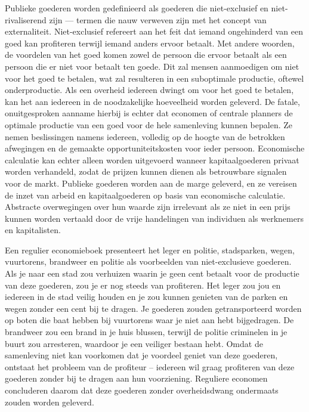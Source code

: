 Publieke goederen worden gedefinieerd als goederen die niet-exclusief en niet-ri\-va\-li\-se\-rend zijn --- termen die nauw verweven zijn met het concept van externaliteit. Niet-exclusief refereert aan het feit dat iemand ongehinderd van een goed kan profiteren terwijl iemand anders ervoor betaalt. Met andere woorden, de voordelen van het goed komen zowel de persoon die ervoor betaalt als een persoon die er niet voor betaalt ten goede. Dit zal mensen aanmoedigen om niet voor het goed te betalen, wat zal resulteren in een suboptimale productie, oftewel onderproductie. Als een overheid iedereen dwingt om voor het goed te betalen, kan het aan iedereen in de noodzakelijke hoeveelheid worden geleverd. De fatale, onuitgesproken aanname hierbij is echter dat economen of centrale planners de optimale productie van een goed voor de hele samenleving kunnen bepalen. Ze nemen beslissingen namens iedereen, volledig op de hoogte van de betrokken afwegingen en de gemaakte opportuniteitskosten voor ieder persoon. Economische calculatie kan echter alleen worden uitgevoerd wanneer kapitaalgoederen privaat worden verhandeld, zodat de prijzen kunnen dienen als betrouwbare signalen voor de markt. Publieke goederen worden aan de marge geleverd, en ze vereisen de inzet van arbeid en kapitaalgoederen op basis van economische calculatie. Abstracte overwegingen over hun waarde zijn irrelevant als ze niet in een prijs kunnen worden vertaald door de vrije handelingen van individuen als werknemers en kapitalisten.

Een regulier economieboek presenteert het leger en politie, stadsparken, wegen, vuurtorens, brandweer en politie als voorbeelden van niet-exclusieve goederen. Als je naar een stad zou verhuizen waarin je geen cent betaalt voor de productie van deze goederen, zou je er nog steeds van profiteren. Het leger zou jou en iedereen in de stad veilig houden en je zou kunnen genieten van de parken en wegen zonder een cent bij te dragen. Je goederen zouden getransporteerd worden op boten die baat hebben bij vuurtorens waar je niet aan hebt bijgedragen. De brandweer zou een brand in je huis blussen, terwijl de politie criminelen in je buurt zou arresteren, waardoor je een veiliger bestaan hebt. Omdat de samenleving niet kan voorkomen dat je voordeel geniet van deze goederen, ontstaat het probleem van de profiteur -- iedereen wil graag profiteren van deze goederen zonder bij te dragen aan hun voorziening. Reguliere economen concluderen daarom dat deze goederen zonder overheidsdwang ondermaats zouden worden geleverd.

